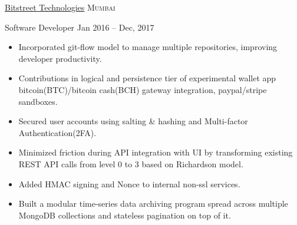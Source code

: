 \documentclass[11pt,a4paper]{article}
\begin{document}



\headedsection
  {\href{http://bitstreet.in/}{Bitstreet Technologies}}
  {\textsc{Mumbai}}
  {%
    \headedsubsection
    {Software Developer}
    {Jan 2016 -- Dec, 2017}
    {
      \begin{itemize}
        \item Incorporated git-flow model to manage multiple repositories, improving developer productivity.
        \item Contributions in logical and persistence tier of experimental %
          wallet app bitcoin(BTC)/bitcoin cash(BCH) gateway integration, paypal/stripe sandboxes.
        \item Secured user accounts using
          salting \& hashing and Multi-factor Authentication(2FA).
        \item Minimized friction during API integration with UI by transforming existing REST API calls from level 0 to 3 based on Richardson model.
        \item Added
          HMAC signing and
          Nonce to internal non-ssl services. 
        \item Built a modular
          time-series data archiving program spread across multiple MongoDB collections and stateless %
          pagination on top of it.
      \end{itemize}
    }
  }
\end{document}

